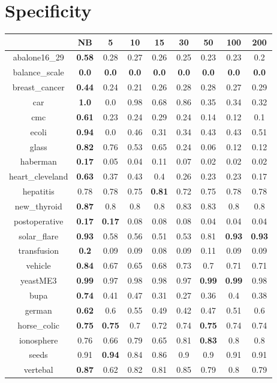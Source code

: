 \documentclass{article}%
\begin{document}
%
\section*{Specificity}%
\begin{tabular}{c|cccccccc}%
\hline%
&NB&5&10&15&30&50&100&200\\%
\hline%
abalone16\_29&\textbf{0.58}&0.28&0.27&0.26&0.25&0.23&0.23&0.2\\%
\hline%
balance\_scale&\textbf{0.0}&\textbf{0.0}&\textbf{0.0}&\textbf{0.0}&\textbf{0.0}&\textbf{0.0}&\textbf{0.0}&\textbf{0.0}\\%
\hline%
breast\_cancer&\textbf{0.44}&0.24&0.21&0.26&0.28&0.28&0.27&0.29\\%
\hline%
car&\textbf{1.0}&0.0&0.98&0.68&0.86&0.35&0.34&0.32\\%
\hline%
cmc&\textbf{0.61}&0.23&0.24&0.29&0.24&0.14&0.12&0.1\\%
\hline%
ecoli&\textbf{0.94}&0.0&0.46&0.31&0.34&0.43&0.43&0.51\\%
\hline%
glass&\textbf{0.82}&0.76&0.53&0.65&0.24&0.06&0.12&0.12\\%
\hline%
haberman&\textbf{0.17}&0.05&0.04&0.11&0.07&0.02&0.02&0.02\\%
\hline%
heart\_cleveland&\textbf{0.63}&0.37&0.43&0.4&0.26&0.23&0.23&0.17\\%
\hline%
hepatitis&0.78&0.78&0.75&\textbf{0.81}&0.72&0.75&0.78&0.78\\%
\hline%
new\_thyroid&\textbf{0.87}&0.8&0.8&0.8&0.83&0.83&0.8&0.8\\%
\hline%
postoperative&\textbf{0.17}&\textbf{0.17}&0.08&0.08&0.08&0.04&0.04&0.04\\%
\hline%
solar\_flare&\textbf{0.93}&0.58&0.56&0.51&0.53&0.81&\textbf{0.93}&\textbf{0.93}\\%
\hline%
transfusion&\textbf{0.2}&0.09&0.09&0.08&0.09&0.11&0.09&0.09\\%
\hline%
vehicle&\textbf{0.84}&0.67&0.65&0.68&0.73&0.7&0.71&0.71\\%
\hline%
yeastME3&\textbf{0.99}&0.97&0.98&0.98&0.97&\textbf{0.99}&\textbf{0.99}&0.98\\%
\hline%
bupa&\textbf{0.74}&0.41&0.47&0.31&0.27&0.36&0.4&0.38\\%
\hline%
german&\textbf{0.62}&0.6&0.55&0.49&0.42&0.47&0.51&0.6\\%
\hline%
horse\_colic&\textbf{0.75}&\textbf{0.75}&0.7&0.72&0.74&\textbf{0.75}&0.74&0.74\\%
\hline%
ionosphere&0.76&0.66&0.79&0.65&0.81&\textbf{0.83}&0.8&0.8\\%
\hline%
seeds&0.91&\textbf{0.94}&0.84&0.86&0.9&0.9&0.91&0.91\\%
\hline%
vertebal&\textbf{0.87}&0.62&0.82&0.81&0.85&0.79&0.8&0.79\\%
\hline%
\end{tabular}
\end{document}
